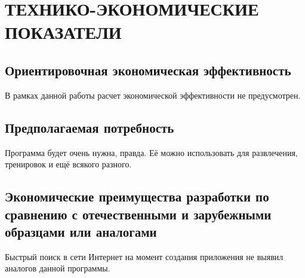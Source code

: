 \section{ТЕХНИКО-ЭКОНОМИЧЕСКИЕ ПОКАЗАТЕЛИ}

\subsection{Ориентировочная экономическая эффективность}
В рамках данной работы расчет экономической эффективности не предусмотрен.

\subsection{Предполагаемая потребность}
Программа будет очень нужна, правда. Её можно использовать для развлечения, тренировок и ещё всякого разного.

\subsection{Экономические преимущества разработки по сравнению с отечественными и зарубежными образцами или аналогами}
Быстрый поиск в сети Интернет на момент создания приложения не выявил аналогов
данной программы.

\clearpage